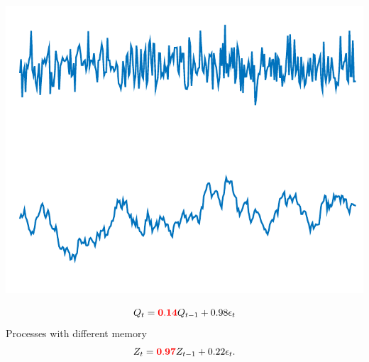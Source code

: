 \documentclass[landscape,a0]{a0poster_csml_v2}
\begin{document}
\begin{poster}
\begin{PosterColumn}
\begin{minipage}[c]{0.4\textwidth}
\includegraphics[width=\textwidth]{../img/processes.pdf}
\end{minipage}
\begin{minipage}[c]{0.5\textwidth}
{\larger[2]$$Q_t =  \mathbf{ \color{red} 0.14} Q_{t-1} + 0.98\epsilon_t$$ }
    Processes with different memory 
	{\larger[2]$$Z_t=   \mathbf{ \color{red} 0.97} Z_{t-1} +  0.22\epsilon_t.$$ }	
\end{minipage}




\vspace{1cm}


\end{PosterColumn}
\end{poster}
\end{document}
